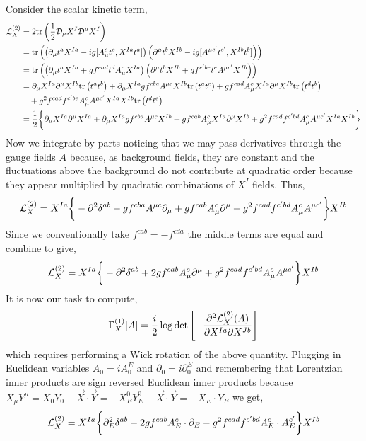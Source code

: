 \documentclass[12pt]{article}
\begin{document}
Consider the scalar kinetic term,
\begin{align*}
\mathcal{L}^{(2)}_X & = 2 \mathrm{tr} \left(  \frac{1}{2} \mathcal{D}_\mu X^I \mathcal{D}^\mu X^I  \right)
\\
& = \mathrm{tr} \left(  \left( \partial_\mu t^a X^{Ia} - i g [ A_\mu^c t^c, X^{Ia} t^a] \right) \left( \partial^\mu t^b X^{Ib} - i g [ A^{\mu c'} t^{c'}, X^{Ib} t^b] \right)  \right)
\\
& = \mathrm{tr} \left(  \left( \partial_\mu t^a X^{Ia} + g f^{cad} t^d A_\mu^c X^{Ia} \right) \left( \partial^\mu t^b X^{Ib} +  g f^{c'be} t^e A^{\mu c'} X^{I b}  \right)  \right)
\\
& = \partial_\mu X^{Ia} \partial^\mu X^{Ib} \mathrm{tr} \left( t^a t^b \right) + \partial_\mu X^{I a} g f^{cbe} A^{\mu c} X^{Ib} \mathrm{tr} \left( t^a t^e \right) + g f^{cad} A^c_\mu X^{Ia} \partial^\mu X^{Ib} \mathrm{tr} \left( t^d t^b \right) 
\\
& \quad + g^2 f^{cad} f^{c'be} A_\mu^c A^{\mu c'}  X^{Ia} X^{I b} \mathrm{tr} \left( t^d t^e \right)
\\
& = \frac{1}{2} \bigg\{ \partial_\mu X^{Ia} \partial^\mu X^{Ia} + \partial_\mu X^{I a} g f^{cba} A^{\mu c} X^{Ib}  + g f^{cab} A^c_\mu X^{Ia} \partial^\mu X^{Ib}  + g^2 f^{cad} f^{c'bd} A_\mu^c A^{\mu c'}  X^{Ia} X^{I b} \bigg\}
\end{align*}
Now we integrate by parts noticing that we may pass derivatives through the gauge fields $A$ because, as background fields, they are constant and the fluctuations above the background do not contribute at quadratic order because they appear multiplied by quadratic combinations of $X^I$ fields. Thus,
\[ \mathcal{L}^{(2)}_X = X^{Ia} \bigg\{ - \partial^2 \delta^{ab} -  g f^{cba} A^{\mu c} \partial_\mu  + g f^{cab} A^c_\mu \partial^\mu  + g^2 f^{cad} f^{c'bd} A_\mu^c A^{\mu c'}  \bigg\} X^{Ib} \]
Since we conventionally take $f^{cab} = -f^{cda}$ the middle terms are equal and combine to give,
\[ \mathcal{L}^{(2)}_X = X^{Ia} \bigg\{ - \partial^2 \delta^{ab} + 2 g f^{cab} A^c_\mu \partial^\mu  + g^2 f^{cad} f^{c'bd} A_\mu^c A^{\mu c'}  \bigg\} X^{Ib} \] 
It is now our task to compute,
\[ \Gamma^{(1)}_X[A] = \frac{i}{2} \log{\det{\left[ - \frac{\partial^2 \mathcal{L}^{(2)}_X(A)}{\partial X^{Ia} \partial X^{J b}} \right]}} \]
which requires performing a Wick rotation of the above quantity. Plugging in Euclidean variables $A_0 = i A_0^E$ and $\partial_0 = i \partial_0^E$ and remembering that Lorentzian inner products are sign reversed Euclidean inner products because $X_\mu Y^{\mu} = X_0 Y_0 - \vec{X} \cdot \vec{Y} = - X^0_E Y^0_E - \vec{X} \cdot \vec{Y} = - X_E \cdot Y_E$ we get,
\[ \mathcal{L}^{(2)}_X = X^{Ia} \bigg\{ \partial_E^2 \delta^{ab} - 2 g f^{cab} A^{c}_E \cdot \partial_E - g^2 f^{cad} f^{c'bd} A^c_E \cdot A^{c'}_E \bigg\} X^{Ib} \] 
\end{document}
